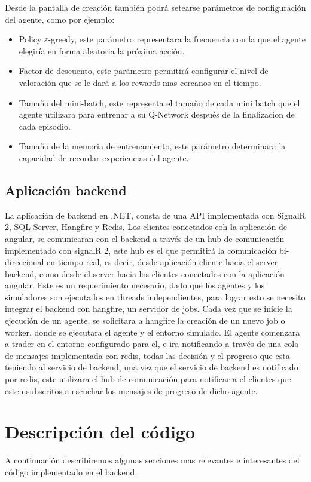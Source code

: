 Desde la pantalla de creación también podrá setearse parámetros de configuración del agente, como por ejemplo:
\begin{itemize}
	\item Policy $\varepsilon$-greedy, este parámetro representara la frecuencia con la que el agente elegiría en forma aleatoria la próxima acción.
	\item Factor de descuento, este parámetro permitirá configurar el nivel de valoración que se le dará a los rewards mas cercanos en el tiempo.
	\item Tamaño del mini-batch, este representa el tamaño de cada mini batch que el agente utilizara para entrenar a su Q-Network después de la finalizacion de cada episodio.
	\item Tamaño de la memoria de entrenamiento, este parámetro determinara la capacidad de recordar experiencias del agente.
\end{itemize}

\subsection{Aplicación backend}

La aplicación de backend en .NET, consta de una API implementada con SignalR 2, SQL Server, Hangfire y Redis. 
Los clientes conectados coh la aplicación de angular, se comunicaran con el backend a través de un hub de comunicación implementado con signalR 2, este hub es el que permitirá la comunicación bi-direccional en tiempo real, es decir, desde aplicación cliente hacia el server backend, como desde el server hacia los clientes conectados con la aplicación angular. Este es un requerimiento necesario, dado que los agentes y los simuladores son ejecutados en threads independientes, para lograr esto se necesito integrar el backend con hangfire, un servidor de jobs. 
Cada vez que se inicie la ejecución de un agente, se solicitara a hangfire la creación de un nuevo job o worker, donde se ejecutara el agente y el entorno simulado. El agente comenzara a trader en el entorno configurado para el, e ira notificando a través de una cola de mensajes implementada con redis, todas las decisión y el progreso que esta teniendo al servicio de backend, una vez que el servicio de backend es notificado por redis, este utilizara el hub de comunicación para notificar a el clientes que esten subscritos a escuchar los mensajes de progreso de dicho agente.

\section{Descripción del código}
A continuación describiremos algunas secciones mas relevantes e interesantes del código implementado en el backend.

